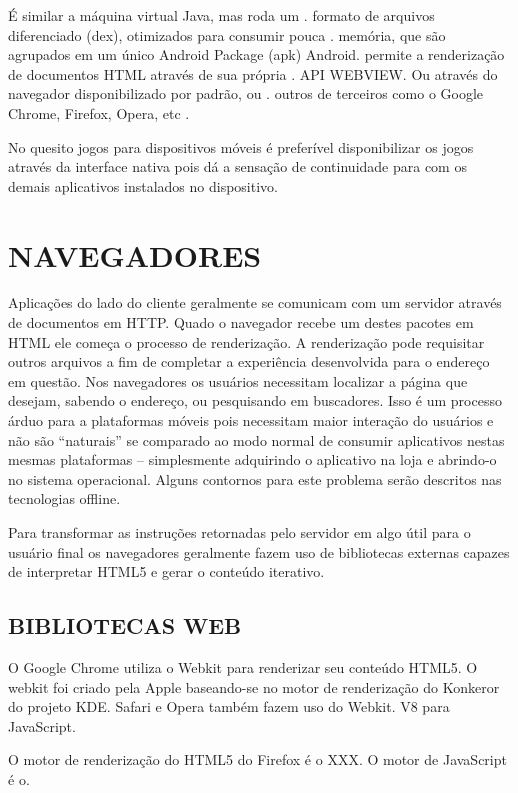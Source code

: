 \documentclass[11pt,a4paper]{article}
\begin{document}
É similar a máquina virtual Java, mas roda um  .
formato de arquivos diferenciado (dex), otimizados para consumir pouca .
memória, que são agrupados em um único Android Package (apk) Android.
permite a renderização de documentos HTML através de sua própria   .
API WEBVIEW. Ou através do navegador disponibilizado por padrão, ou  .
outros de terceiros como o Google Chrome, Firefox, Opera, etc          .

No quesito jogos para dispositivos móveis é preferível disponibilizar
os jogos através da interface nativa pois dá a sensação de
continuidade para com os demais aplicativos instalados no dispositivo.



\section{NAVEGADORES}

Aplicações do lado do cliente geralmente se comunicam com um servidor através de documentos em HTTP. Quado o navegador recebe um destes pacotes em HTML ele começa o processo de renderização. A renderização pode requisitar outros arquivos a fim de completar a experiência desenvolvida para o endereço em questão.
Nos navegadores os usuários necessitam localizar a página que desejam, sabendo o endereço, ou pesquisando em buscadores. Isso é um processo árduo para a plataformas móveis pois necessitam maior interação do usuários e não são “naturais” se comparado ao modo normal de consumir aplicativos nestas mesmas plataformas – simplesmente adquirindo o aplicativo na loja e abrindo-o no sistema operacional. Alguns contornos para este problema serão descritos nas tecnologias offline.

Para transformar as instruções retornadas pelo servidor em algo útil para o usuário final os navegadores geralmente fazem uso de bibliotecas externas capazes de interpretar HTML5 e gerar o conteúdo iterativo.

\subsection{BIBLIOTECAS WEB}

O Google Chrome utiliza o Webkit para renderizar seu conteúdo HTML5. O webkit foi criado pela Apple baseando-se no motor de renderização do Konkeror do projeto KDE. Safari e Opera também fazem uso do Webkit. V8 para JavaScript.

O motor de renderização do HTML5 do Firefox é o XXX. O motor de JavaScript é o.
\end{document}
